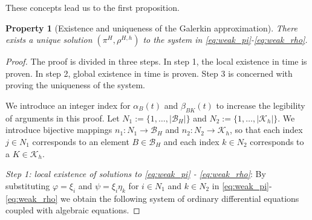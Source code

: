 \documentclass{article}
\newtheorem{prop}{Property}
\newcommand{\B}{\mathcal{ B}}
\newcommand{\K}{\mathcal{ K}}
\begin{document}
These concepts lead us to the first proposition.
\ \\
\begin{prop}[Existence and uniqueness of the Galerkin approximation]
    \label{prop:ex_un}
    There exists a unique solution $(\pi^H,\rho^{H,h})$ to the system in \eqref{eq:weak_pi}-\eqref{eq:weak_rho}.
\end{prop}
\begin{proof}
    The proof is divided in three steps.  In step 1, the local existence in time is proven. In step 2, global existence in time is proven. Step 3 is concerned with proving the uniqueness of the system.

    We introduce an integer index for $\alpha_B(t)$ and $\beta_{BK}(t)$ to increase the legibility of arguments in this proof.
    Let $N_1 := \{1,\dots, |\B_H|\}$ and $N_2 := \{1,\dots, |\K_h|\}$. We introduce bijective mappings $n_1:N_1\to \B_H$ and $n_2: N_2 \to \K_h$, so that each index $j\in N_1$ corresponds to an element $B \in \B_H$ and each index $k\in N_2$ corresponds to a $K \in \K_h$.

    \textit{Step 1: local existence of solutions to \eqref{eq:weak_pi} - \eqref{eq:weak_rho}}:
    By substituting $\varphi = \xi_i$ and $\psi = \xi_i\eta_k$ for $i\in N_1$ and $k\in N_2$ in \eqref{eq:weak_pi}-\eqref{eq:weak_rho} we obtain the following system of ordinary differential equations coupled with algebraic equations.


\end{proof}
\end{document}
